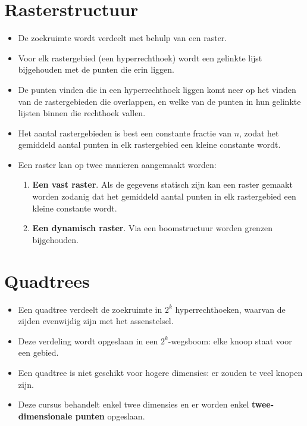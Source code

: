 \section{Rasterstructuur}
\begin{itemize}
    \item De zoekruimte wordt verdeelt met behulp van een raster.
    \item Voor elk rastergebied (een hyperrechthoek) wordt een gelinkte lijst bijgehouden met de punten die erin liggen.
    \item De punten vinden die in een hyperrechthoek liggen komt neer op het vinden van de rastergebieden die overlappen, en welke van de punten in hun gelinkte lijsten binnen die rechthoek vallen.
    \item Het aantal rastergebieden is best een constante fractie van $n$, zodat het gemiddeld aantal punten in elk rastergebied een kleine constante wordt.
    \item Een raster kan op twee manieren aangemaakt worden:
    \begin{enumerate}
        \item \textbf{Een vast raster}. Als de gegevens statisch zijn kan een raster gemaakt worden zodanig dat het gemiddeld aantal punten in elk rastergebied een kleine constante wordt.
        \item \textbf{Een dynamisch raster}. Via een boomstructuur worden grenzen bijgehouden.
    \end{enumerate}
\end{itemize}
\section{Quadtrees}
\begin{itemize}
    \item Een quadtree verdeelt de zoekruimte in $2^k$ hyperrechthoeken, waarvan de zijden evenwijdig zijn met het assenstelsel.
    \item Deze verdeling wordt opgeslaan in een $2^k$-wegsboom: elke knoop staat voor een gebied.
    \item Een quadtree is niet geschikt voor hogere dimensies: er zouden te veel knopen zijn.
    \item Deze cursus behandelt enkel twee dimensies en er worden enkel \textbf{twee-dimensionale punten} opgeslaan.
\end{itemize}

